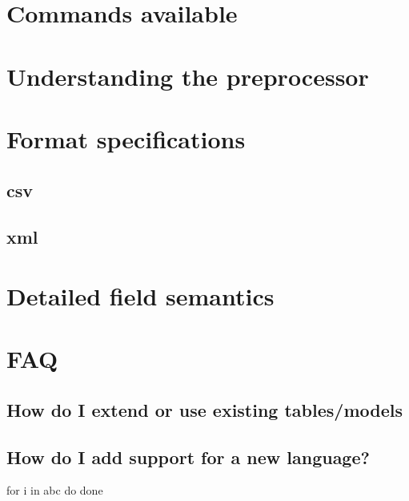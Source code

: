     \section{Commands available}

    \section{Understanding the preprocessor}

    \section{Format specifications}

        \subsection{csv}

        \subsection{xml}

    \section{Detailed field semantics}

    \section{FAQ}
        \subsection{How do I extend or use existing tables/models}

        \subsection{How do I add support for a new language?}

\begin{code}
for i in abc
do
done
\end{code}



